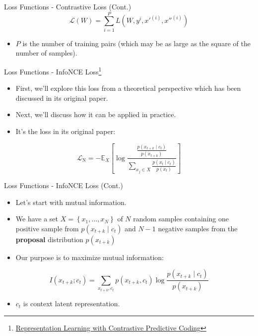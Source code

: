 \documentclass[serif, aspectratio=169]{beamer}
\begin{document}
\begin{frame}{Loss Functions - Contrastive Loss (Cont.)}
\begin{equation*}
\mathcal{L}(W)=\sum_{i=1}^P L\left(W,y^i, x'^{\left(i\right)}, x''^{\left(i\right)}\right)
\end{equation*}

    \begin{itemize}
        \item $P$ is the number of training pairs (which may be as large as the
square of the number of samples).
    \end{itemize}
\end{frame}


 \begin{frame}{Loss Functions - InfoNCE Loss\footnote{\href{https://arxiv.org/pdf/1807.03748v2}{Representation Learning with Contrastive Predictive Coding}}}
     \begin{itemize}
         \item First, we'll explore this loss from a theoretical perspective which has been discussed in its original paper.
         \item Next, we'll discuss how it can be applied in practice.
         \item It's the loss in its original paper:
     \end{itemize}

     \begin{equation*}
         \mathcal{L}_{\mathrm{N}}=-{\mathbb{E}_X}\left[\log \frac
         {\frac{p\left(x_{t+k} \mid c_t\right)}{p\left(x_{t+k}\right)}}
         {\sum_{x_j \in X} \frac{p\left(x_{t} \mid c_t\right)}{p\left(x_{t}\right)}}
         \right]
     \end{equation*}
 \end{frame}


\begin{frame}{Loss Functions - InfoNCE Loss (Cont.)}
     \begin{itemize}
         \item Let's start with mutual information.
         \item We have a set $X=\left\{x_1, \ldots, x_N\right\}$ of $N$ random samples containing one positive sample from $p\left(x_{t+k} \mid c_t\right)$ and $N - 1$ negative samples from the \textbf{proposal} distribution $p\left(x_{t+k}\right)$
         \item Our purpose is to maximize mutual information:
     \end{itemize}

     \begin{equation*}
         I(x_{t+k}; c_t)=\sum_{x_{t+k}, c_t} p(x_{t+k}, c_t) \log \frac{p(x_{t+k} \mid c_t)}{p(x_{t+k})}
     \end{equation*}

     \begin{itemize}
         \item $c_t$ is context latent representation.
     \end{itemize}
\end{frame}
\end{document}
